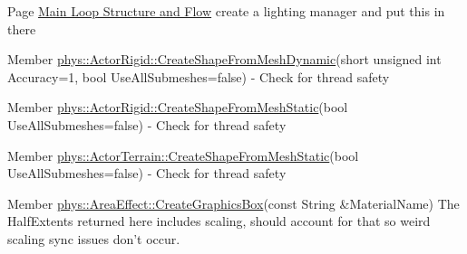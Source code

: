 \label{todo__todo000031}
\hypertarget{todo__todo000031}{}
 
\begin{DoxyDescription}
\item[Page \hyperlink{mainloop1}{Main Loop Structure and Flow} ]create a lighting manager and put this in there 
\end{DoxyDescription}

\label{todo__todo000001}
\hypertarget{todo__todo000001}{}
 
\begin{DoxyDescription}
\item[Member \hyperlink{classphys_1_1ActorRigid_a78f2f2dfc8b35f13e9a7680189bbdd48}{phys::ActorRigid::CreateShapeFromMeshDynamic}(short unsigned int Accuracy=1, bool UseAllSubmeshes=false) ]-\/ Check for thread safety 
\end{DoxyDescription}

\label{todo__todo000002}
\hypertarget{todo__todo000002}{}
 
\begin{DoxyDescription}
\item[Member \hyperlink{classphys_1_1ActorRigid_a5adfa6199955f9c0de4e0af54aeb96f6}{phys::ActorRigid::CreateShapeFromMeshStatic}(bool UseAllSubmeshes=false) ]-\/ Check for thread safety 
\end{DoxyDescription}

\label{todo__todo000003}
\hypertarget{todo__todo000003}{}
 
\begin{DoxyDescription}
\item[Member \hyperlink{classphys_1_1ActorTerrain_aaed245d7af66230aaabb02a84e891bb0}{phys::ActorTerrain::CreateShapeFromMeshStatic}(bool UseAllSubmeshes=false) ]-\/ Check for thread safety 
\end{DoxyDescription}

\label{todo__todo000004}
\hypertarget{todo__todo000004}{}
 
\begin{DoxyDescription}
\item[Member \hyperlink{classphys_1_1AreaEffect_a169a8cba1c9aec84573788dff001fb31}{phys::AreaEffect::CreateGraphicsBox}(const String \&MaterialName) ]The HalfExtents returned here includes scaling, should account for that so weird scaling sync issues don't occur. 
\end{DoxyDescription}

\label{todo__todo000006}
\hypertarget{todo__todo000006}{}
 
